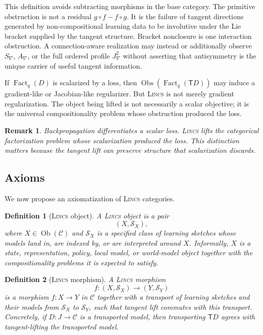 \documentclass{article}
\newtheorem{definition}{Definition}
\newtheorem{remark}{Remark}
\newcommand{\C}{\mathcal{C}}
\newcommand{\T}{\mathsf{T}}
\newcommand{\Ob}{\operatorname{Ob}}
\newcommand{\Fact}{\operatorname{Fact}}
\newcommand{\Obs}{\operatorname{Obs}}
\begin{document}
This definition avoids subtracting morphisms in the base category. The primitive obstruction is not a residual \(g\circ f-f\circ g\). It is the failure of tangent directions generated by non-compositional learning data to be involutive under the Lie bracket supplied by the tangent structure.  Bracket nonclosure is one interaction obstruction.  A connection-aware realization may instead or additionally observe $S_\nabla$, $A_\nabla$, or the full ordered profile $J^2_\nabla$ without asserting that antisymmetry is the unique carrier of useful tangent information.

If \(\Fact_q(D)\) is scalarized by a loss, then \(\Obs(\Fact_q(\T D))\) may induce a gradient-like or Jacobian-like regularizer. But \textsc{Lincs}   is not merely gradient regularization. The object being lifted is not necessarily a scalar objective; it is the universal compositionality problem whose obstruction produced the loss.

\begin{remark}
Backpropagation differentiates a scalar loss. \textsc{Lincs}   lifts the categorical factorization problem whose scalarization produced the loss. This distinction matters because the tangent lift can preserve structure that scalarization discards.
\end{remark}

\subsection{Axioms}

We now propose an axiomatization of \textsc{Lincs}   categories.

\begin{definition}[\textsc{Lincs}   object]
A \textsc{Lincs}   object is a pair
\[
(X,\mathcal S_X),
\]
where \(X\in\Ob(\C)\) and \(\mathcal S_X\) is a specified class of learning sketches whose models land in, are indexed by, or are interpreted around \(X\). Informally, \(X\) is a state, representation, policy, local model, or world-model object together with the compositionality problems it is expected to satisfy.
\end{definition}

\begin{definition}[\textsc{Lincs}   morphism]
A \textsc{Lincs}   morphism
\[
f:(X,\mathcal S_X)\to(Y,\mathcal S_Y)
\]
is a morphism \(f:X\to Y\) in \(\C\) together with a transport of learning sketches and their models from \(\mathcal S_X\) to \(\mathcal S_Y\), such that tangent lift commutes with this transport. Concretely, if \(D:J\to\C\) is a transported model, then transporting \(\T D\) agrees with tangent-lifting the transported model.
\end{definition}
\end{document}
